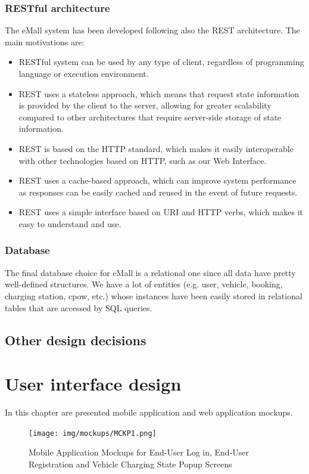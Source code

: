\documentclass[a4paper]{report}
\begin{document}
\subsection{RESTful architecture}
The eMall system has been developed following also the REST architecture. The main motivations are:
\begin{itemize}
    \item RESTful system can be used by any type of client, regardless of programming language or execution environment.
    \item REST uses a stateless approach, which means that request state information is provided by the client to the server, allowing for greater scalability compared to other architectures that require server-side storage of state information.
    \item REST is based on the HTTP standard, which makes it easily interoperable with other technologies based on HTTP, such as our Web Interface.
    \item REST uses a cache-based approach, which can improve system performance as responses can be easily cached and reused in the event of future requests.
    \item REST uses a simple interface based on URI and HTTP verbs, which makes it easy to understand and use.
\end{itemize}

\subsection{Database}
The final database choice for eMall is a relational one since all data have pretty well-defined structures. We have a lot of entities (e.g. user, vehicle, booking, charging station, cpow, etc.) whose instances have been easily stored in relational tables that are accessed by SQL queries.

\section{Other design decisions}


\chapter{User interface design}
In this chapter are presented mobile application and web application mockups.

\begin{figure}[hp]
\centering
\texttt{[image: img/mockups/MCKP1.png]}
\caption{Mobile Application Mockups for End-User Log in, End-User Registration and Vehicle Charging State Popup Screens}
\label{fig:MobileApp-activity}
\end{figure}
\end{document}
